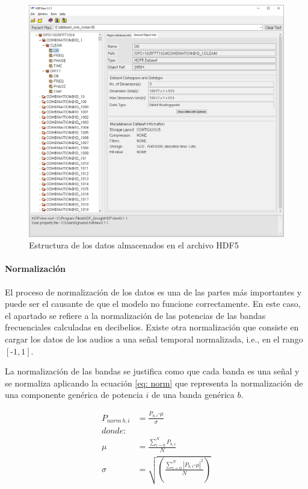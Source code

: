 \begin{figure}[h!]
	\centering
	\includegraphics[width=0.9\columnwidth]{figures/HDF5_struct2}
	\caption{Estructura de los datos almacenados en el archivo \gls{HDF5}}
	\label{fig: hdf5_struct2}
\end{figure}

\paragraph{Normalización}

El proceso de normalización de los datos es una de las partes más importantes y puede ser el causante de que el modelo no funcione correctamente. En este caso, el apartado se refiere a la normalización de las potencias de las bandas frecuenciales calculadas en decibelios. Existe otra normalización que consiste en cargar los datos de los audios a una señal temporal normalizada, i.e., en el rango $\left[\text{-}1,1\right]$.

La normalización de las bandas se justifica como que cada banda es una señal y se normaliza aplicando la ecuación \ref{eq: norm} que representa la normalización de una componente genérica de potencia $i$ de una banda genérica $b$.

\begin{align}
\nonumber
P_{norm~b,i} &= \frac{P_{b,i} \text{-}\mu}{\sigma} \\ \nonumber
donde: \\ \nonumber
\mu&=\frac{\sum_{i=0}^{N}P_{b, i}}{N} \\ \nonumber
\sigma &= \sqrt{ \left( \frac{\sum_{i=0}^{N}{ {\left| P_{b, i} \text{-} \mu \right|}^2}}{N} \right) }
\end{align}
\label{eq: norm}

